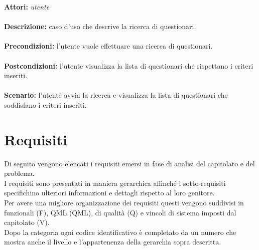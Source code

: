 \documentclass[a4paper,11pt]{article}
\begin{document}

\textbf{Attori:} \textit{utente}
\\ \\
\textbf{Descrizione:} caso d'uso che descrive la ricerca di questionari.\\
\\
\textbf{Precondizioni:} l'utente vuole effettuare una ricerca di questionari.\\
\\
\textbf{Postcondizioni:} l’utente visualizza la lista di questionari che rispettano i criteri inseriti.\\
\\
\textbf{Scenario:} l’utente avvia la ricerca e visualizza la lista di questionari che soddisfano i criteri inseriti.\\
	
	
	\newpage
	\section{Requisiti}
		Di seguito vengono elencati i requisiti emersi in fase di analisi del capitolato e del problema.\\
		I requisiti sono presentati in maniera gerarchica affinché i sotto-requisiti specifichino ulteriori informazioni e dettagli rispetto al loro genitore.\\
		Per avere una migliore organizzazione dei requisiti questi vengono suddivisi in funzionali (F), QML (QML), di qualità (Q) e vincoli di sistema imposti dal capitolato (V).\\
		Dopo la categoria ogni codice identificativo è completato da un numero che mostra anche il livello e l'appartenenza della gerarchia sopra descritta.\\
\end{document}
